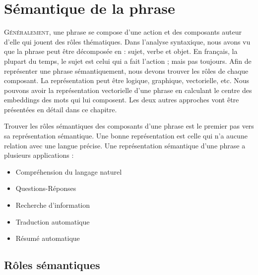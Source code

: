 \documentclass{KodeBook}
\begin{document}
		\mainmatter
	
\fi
\chapter{Sémantique de la phrase}

\begin{introduction}
	\lettrine{G}{énéralement}, une phrase se compose d'une action et des composants auteur d'elle qui jouent des rôles thématiques.
	Dans l'analyse syntaxique, nous avons vu que la phrase peut être décomposée en : sujet, verbe et objet.
	En français, la plupart du temps, le sujet est celui qui a fait l'action ; mais pas toujours. 
	Afin de représenter une phrase sémantiquement, nous devons trouver les rôles de chaque composant. 
	La représentation peut être logique, graphique, vectorielle, etc. 
	Nous pouvons avoir la représentation vectorielle d'une phrase en calculant le centre des embeddings des mots qui lui composent. 
	Les deux autres approches vont être présentées en détail dans ce chapitre.  
\end{introduction} 


Trouver les rôles sémantiques des composants d'une phrase est le premier pas vers sa représentation sémantique. 
Une bonne représentation est celle qui n'a aucune relation avec une langue précise. 
Une représentation sémantique d'une phrase a plusieurs applications : 
\begin{itemize}
	\item Compréhension du langage naturel
	\item Questions-Réponses
	\item Recherche d'information
	\item Traduction automatique
	\item Résumé automatique
\end{itemize}

\section{Rôles sémantiques}
\end{document}
